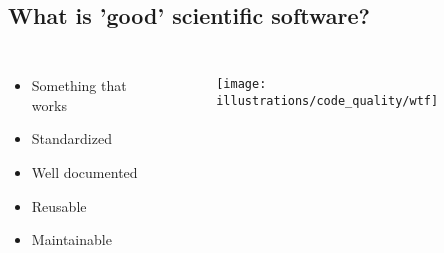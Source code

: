 \documentclass[usenames,dvipsnames]{beamer}
\theoremstyle{plain}
\theoremstyle{definition}
\begin{document}
\begin{frame}{\setframetitle{}}
{
    \begin{columns}
        \begin{figure}
         {}
       \end{figure}
     \end{columns}
}
\end{frame}



\subsection{What is 'good' scientific software?}


\begin{frame}{\setframetitle{}}
  {
    \begin{columns}[t]
      \begin{itemize}
      \item Something that works

      \item Standardized
      \item Well documented
      \item Reusable
      \item Maintainable
      \end{itemize}
 \begin{figure}
        \captionsetup[subfigure]{justification=centering}
        \centering
        \subcaptionbox{}
        {\texttt{[image: illustrations/code\_quality/wtf]}}
      \end{figure}
    \end{columns}
}

\end{frame}
\end{document}
